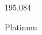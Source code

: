 \documentclass[12pt]{article}
\begin{document}
\hfill{}
\vfill
\begin{center}
  {\fontsize{50}{60}
  }

  \vspace{1em}

  195.084

Platinum
\end{center}
\vfill
\end{document}
